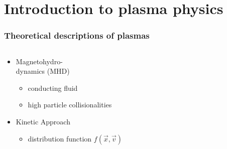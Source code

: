\documentclass{beamer}
\begin{document}
\section{Introduction to plasma physics}
\begin{frame}
\frametitle{Theoretical descriptions of plasmas}
\vspace{-1.5 cm}
\begin{columns}[onlytextwidth]
	\begin{column}{0.5\textwidth}
		\begin{center}
			\begin{itemize}
			\item Magnetohydro-\\
			dynamics (MHD)
			\begin{itemize}
				\item conducting fluid
				\item high particle collisionalities \\
			\end{itemize}
				\item Kinetic Approach
				\begin{itemize}
						\item distribution function $f(\vec{x},\vec{v})$
				\end{itemize}
			\end{itemize}
		\end{center}
		


\end{column}
\end{columns}
\end{frame}
\end{document}
